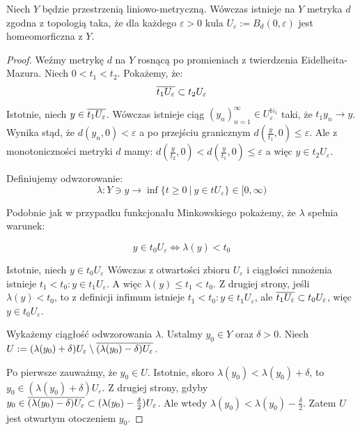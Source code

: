 \begin{lem}
  Niech $Y$ będzie przestrzenią liniowo-metryczną. Wówczas istnieje na $Y$ metryka $d$ zgodna z topologią taka, że dla każdego $\varepsilon > 0$ kula $U_\varepsilon := B_d(0, \varepsilon)$ jest homeomorficzna z $Y$.
  
  \begin{proof}
    Weźmy metrykę $d$ na $Y$ rosnącą po promieniach z twierdzenia Eidelheita-Mazura. Niech $0 < t_1 < t_2$. Pokażemy, że:
    \[
      \overline{t_1 U_\varepsilon} \subset t_2 U_\varepsilon
    \]
    
    Istotnie, niech $y \in \overline{t_1 U_\varepsilon}$. Wówczas istnieje ciąg $(y_n)_{n=1}^\infty \in U_\varepsilon^{\mathbb{N}_1}$ taki, że $t_1 y_n \to y$. Wynika stąd, że $d(y_n, 0) < \varepsilon$ a po przejściu granicznym $d(\frac{y}{t_1}, 0) \leq \varepsilon$. Ale z monotoniczności metryki $d$ mamy: $d(\frac{y}{t_2}, 0) < d(\frac{y}{t_1}, 0) \leq \varepsilon$ a więc $y \in t_2 U_\varepsilon$.
    
    Definiujemy odwzorowanie:
    \[
      \lambda: Y \ni y \to \inf \{t \geq 0\ |\ y \in t U_\varepsilon\} \in [0, \infty)
    \]
    
    Podobnie jak w przypadku funkcjonału Minkowskiego pokażemy, że $\lambda$ spełnia warunek:
    
    \[
      y \in t_0 U_\varepsilon \iff \lambda(y) < t_0
    \]
    
    Istotnie, niech $y \in t_0 U_\varepsilon$
    Wówczas z otwartości zbioru $U_\varepsilon$ i ciągłości mnożenia istnieje $t_1 < t_0: y \in t_1 U_\varepsilon$.
    A więc $\lambda(y) \leq t_1 < t_0$.
    Z drugiej strony, jeśli $\lambda(y) < t_0$, to z definicji infimum istnieje $t_1 < t_0: y \in t_1 U_\varepsilon$, ale $\overline{t_1 U_\varepsilon} \subset t_0 U_\varepsilon$, więc $y \in t_0 U_\varepsilon$.

    Wykażemy ciągłość odwzorowania $\lambda$.
    Ustalmy $y_0 \in Y$ oraz $\delta > 0$.
    Niech $U := (\lambda(y_0) + \delta) U_\varepsilon \setminus \overline{(\lambda(y_0)-\delta) U_\varepsilon}$.
    
    Po pierwsze zauważmy, że $y_0 \in U$.
    Istotnie, skoro $\lambda(y_0) < \lambda(y_0) + \delta$, to $y_0 \in (\lambda(y_0) + \delta) U_\varepsilon$.
    Z drugiej strony, gdyby $y_0 \in \overline{(\lambda(y_0) - \delta) U_\varepsilon} \subset (\lambda(y_0) - \frac{\delta}{2}) U_\varepsilon$. Ale wtedy $\lambda(y_0) < \lambda(y_0) - \frac{\delta}{2}$.
    Zatem $U$ jest otwartym otoczeniem $y_0$.
    

\end{proof}
\end{lem}
